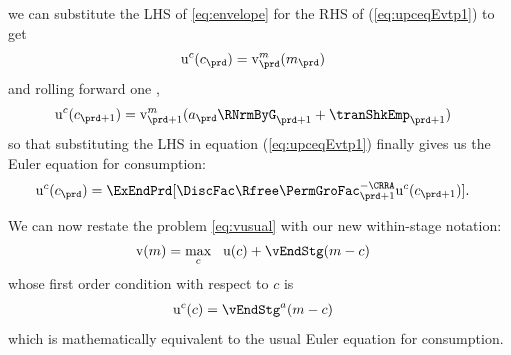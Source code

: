 \documentclass[titlepage, headings=optiontotocandhead]{econtex}
\begin{document}
we can substitute the LHS of \eqref{eq:envelope} for the RHS of
(\ref{eq:upceqEvtp1}) to get
  \begin{equation}\begin{gathered}\begin{aligned}
        \mathrm{u}^{c}(c_{\prd})  & = {\mathrm{v}}^{m}_{\prd}(m_{\prd})\label{eq:upcteqvtp}
      \end{aligned}\end{gathered}\end{equation}
and rolling forward one {\interval},
\begin{equation}\begin{gathered}\begin{aligned}
      \mathrm{u}^{c}(c_{\prd+1})  & = \mathrm{v}^{m}_{\prd+1}({a}_{\prd}\RNrmByG_{\prd+1}+\tranShkEmp_{\prd+1}) \label{eq:upctp1EqVpxtp1}
    \end{aligned}\end{gathered}\end{equation}
so that substituting the LHS in equation (\ref{eq:upceqEvtp1}) finally gives us the Euler equation for consumption:
  \begin{equation}\begin{gathered}\begin{aligned}
        \mathrm{u}^{c}(c_{\prd})  & = \ExEndPrd[\DiscFac \Rfree \PermGroFac_{\prd+1}^{-\CRRA}\mathrm{u}^{c}(c_{\prd+1})] \label{eq:cEuler}.
      \end{aligned}\end{gathered}\end{equation}

We can now restate the problem \eqref{eq:vusual} with our new within-stage notation:
\begin{equation}\begin{gathered}\begin{aligned}
      \mathrm{v}(m) & = \max_{c} ~~ \mathrm{u}(c)+ \vEndStg(m-c)
\end{aligned}\end{gathered}\end{equation}
whose first order condition with respect to $c$ is
\begin{equation}\begin{gathered}\begin{aligned}
  \mathrm{u}^{c}(c) &= \vEndStg^{a}(m-c)  \label{eq:upEqbetaOp} %
\end{aligned}\end{gathered}\end{equation}
which is mathematically equivalent to the usual Euler equation for consumption.
\end{document}
